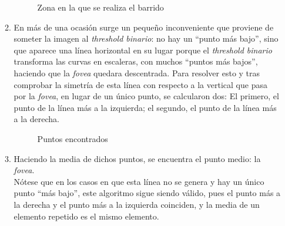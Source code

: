 \begin{enumerate}
\begin{enumerate}[label*=\arabic*.]
      \begin{figure}[H]
        \caption{Zona en la que se realiza el barrido}
        \centering \setlength\fboxsep{0pt} \setlength\fboxrule{0.5pt}
      \end{figure}

  \item En más de una ocasión surge un pequeño inconveniente que
    proviene de someter la imagen al \emph{threshold binario}: no hay
    un ``punto más bajo'', sino que aparece una línea horizontal en su
    lugar porque el \emph{threshold binario} transforma las curvas en
    escaleras, con muchos ``puntos más bajos'', haciendo que la
    \emph{\gls{fovea}} quedara descentrada. Para resolver esto y tras
    comprobar la simetría de esta línea con respecto a la vertical que
    pasa por la \emph{\gls{fovea}}, en lugar de un único punto, se
    calcularon dos: El primero, el punto de la línea más a la
    izquierda; el segundo, el punto de la línea más a la
    derecha. 

      \begin{figure}[H]
        \caption{Puntos encontrados}
        \centering \setlength\fboxsep{0pt} \setlength\fboxrule{0.5pt}
      \end{figure}

  \item Haciendo la media de dichos
    puntos, se encuentra el punto medio: la \emph{\gls{fovea}}. \\
    Nótese que en los casos en que esta línea no se genera y hay un
    único punto ``más bajo'', este algoritmo sigue siendo válido, pues
    el punto más a la derecha y el punto más a la izquierda coinciden,
    y la media de un elemento repetido es el mismo elemento.


\end{enumerate}
\end{enumerate}
